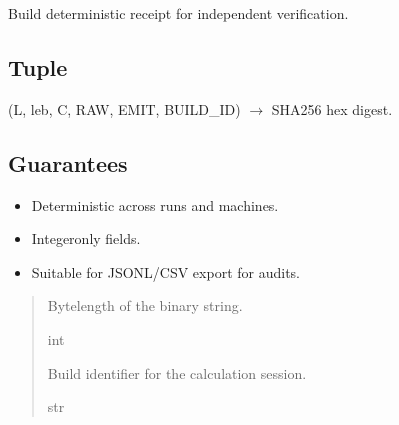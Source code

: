 \documentclass[letterpaper,10pt,english]{sphinxmanual}
\begin{document}
\begin{fulllineitems}
\label{\detokenize{clf_calculator:clf_calculator.receipt}}
\pysigstartsignatures
\pysiglinewithargsret
{}
{\sphinxparamcomma {}}
{}
\pysigstopsignatures
\sphinxAtStartPar
Build deterministic receipt for independent verification.


\subsection{Tuple}
\label{\detokenize{clf_calculator:tuple}}
\sphinxAtStartPar
(L, leb, C, RAW, EMIT, BUILD\_ID)  \(\rightarrow\) SHA256 hex digest.


\subsection{Guarantees}
\label{\detokenize{clf_calculator:guarantees}}\begin{itemize}
\item {} 
\sphinxAtStartPar
Deterministic across runs and machines.

\item {} 
\sphinxAtStartPar
Integer\sphinxhyphen{}only fields.

\item {} 
\sphinxAtStartPar
Suitable for JSONL/CSV export for audits.

\end{itemize}
\begin{quote}\begin{description}
\sphinxAtStartPar
{}

\sphinxAtStartPar
Byte\sphinxhyphen{}length of the binary string.

\sphinxAtStartPar
int

\sphinxAtStartPar
{}

\sphinxAtStartPar
Build identifier for the calculation session.

\sphinxAtStartPar
str


\end{description}
\end{quote}
\end{fulllineitems}
\end{document}
